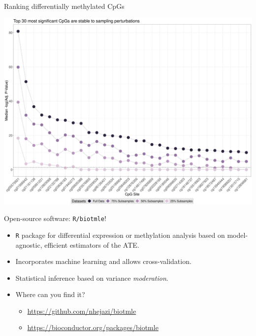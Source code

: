 \documentclass{beamer}
\begin{document}

\begin{frame}{Ranking differentially methylated CpGs}

\centering
\includegraphics[origin=c,scale=0.22]{cpg_ranks}

\note{
}
\end{frame}


\begin{frame}[c]{Open-source software: \texttt{R/biotmle}!}

\begin{center}
\begin{itemize}
  \itemsep6pt
  \item \texttt{R} package for differential expression or methylation analysis
     based on model-agnostic, efficient estimators of the ATE.
  \item Incorporates machine learning and allows cross-validation.
  \item Statistical inference based on variance \textit{moderation}.
  \item Where can you find it?
    \begin{itemize}
      \itemsep4pt
      \item \url{https://github.com/nhejazi/biotmle}
      \item \url{https://bioconductor.org/packages/biotmle}
    \end{itemize}
\end{itemize}
\end{center}

\end{frame}
\end{document}
